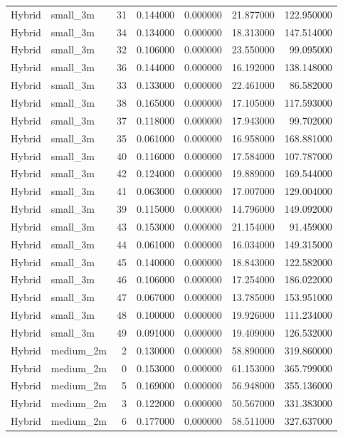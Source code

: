 \begin{tabular}{llrrrrr}
Hybrid & small_3m & 31 & 0.144000 & 0.000000 & 21.877000 & 122.950000 \\
Hybrid & small_3m & 34 & 0.134000 & 0.000000 & 18.313000 & 147.514000 \\
Hybrid & small_3m & 32 & 0.106000 & 0.000000 & 23.550000 & 99.095000 \\
Hybrid & small_3m & 36 & 0.144000 & 0.000000 & 16.192000 & 138.148000 \\
Hybrid & small_3m & 33 & 0.133000 & 0.000000 & 22.461000 & 86.582000 \\
Hybrid & small_3m & 38 & 0.165000 & 0.000000 & 17.105000 & 117.593000 \\
Hybrid & small_3m & 37 & 0.118000 & 0.000000 & 17.943000 & 99.702000 \\
Hybrid & small_3m & 35 & 0.061000 & 0.000000 & 16.958000 & 168.881000 \\
Hybrid & small_3m & 40 & 0.116000 & 0.000000 & 17.584000 & 107.787000 \\
Hybrid & small_3m & 42 & 0.124000 & 0.000000 & 19.889000 & 169.544000 \\
Hybrid & small_3m & 41 & 0.063000 & 0.000000 & 17.007000 & 129.004000 \\
Hybrid & small_3m & 39 & 0.115000 & 0.000000 & 14.796000 & 149.092000 \\
Hybrid & small_3m & 43 & 0.153000 & 0.000000 & 21.154000 & 91.459000 \\
Hybrid & small_3m & 44 & 0.061000 & 0.000000 & 16.034000 & 149.315000 \\
Hybrid & small_3m & 45 & 0.140000 & 0.000000 & 18.843000 & 122.582000 \\
Hybrid & small_3m & 46 & 0.106000 & 0.000000 & 17.254000 & 186.022000 \\
Hybrid & small_3m & 47 & 0.067000 & 0.000000 & 13.785000 & 153.951000 \\
Hybrid & small_3m & 48 & 0.100000 & 0.000000 & 19.926000 & 111.234000 \\
Hybrid & small_3m & 49 & 0.091000 & 0.000000 & 19.409000 & 126.532000 \\
Hybrid & medium_2m & 2 & 0.130000 & 0.000000 & 58.890000 & 319.860000 \\
Hybrid & medium_2m & 0 & 0.153000 & 0.000000 & 61.153000 & 365.799000 \\
Hybrid & medium_2m & 5 & 0.169000 & 0.000000 & 56.948000 & 355.136000 \\
Hybrid & medium_2m & 3 & 0.122000 & 0.000000 & 50.567000 & 331.383000 \\
Hybrid & medium_2m & 6 & 0.177000 & 0.000000 & 58.511000 & 327.637000 \\

\end{tabular}
